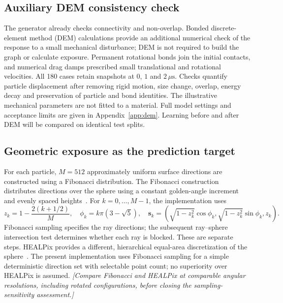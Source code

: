 \documentclass[11pt,a4paper]{article}
\newcommand{\pending}[1]{{\color{red}\textit{[#1]}}}
\begin{document}
\subsection{Auxiliary DEM consistency check}
The generator already checks connectivity and non-overlap. Bonded discrete-element method (DEM) calculations provide an additional numerical check of the response to a small mechanical disturbance; DEM is not required to build the graph or calculate exposure. Permanent rotational bonds join the initial contacts, and numerical drag damps prescribed small translational and rotational velocities. All 180 cases retain snapshots at $0$, $1$ and $2\,\mu\mathrm{s}$. Checks quantify particle displacement after removing rigid motion, size change, overlap, energy decay and preservation of particle and bond identities. The illustrative mechanical parameters are not fitted to a material. Full model settings and acceptance limits are given in Appendix~\ref{app:dem}. Learning before and after DEM will be compared on identical test splits.

\subsection{Geometric exposure as the prediction target}
For each particle, $M=512$ approximately uniform surface directions are constructed using a Fibonacci distribution. The Fibonacci construction distributes directions over the sphere using a constant golden-angle increment and evenly spaced heights~\cite{Gonzalez2010}. For $k=0,\ldots,M-1$, the implementation uses
\begin{equation}
 z_k=1-\frac{2(k+1/2)}{M},\quad \phi_k=k\pi(3-\sqrt{5}),\quad
 \boldsymbol{s}_k=\left(\sqrt{1-z_k^2}\cos\phi_k,\sqrt{1-z_k^2}\sin\phi_k,z_k\right).
\end{equation}
Fibonacci sampling specifies the ray directions; the subsequent ray--sphere intersection test determines whether each ray is blocked. These are separate steps. HEALPix provides a different, hierarchical equal-area discretization of the sphere~\cite{Gorski2005}. The present implementation uses Fibonacci sampling for a simple deterministic direction set with selectable point count; no superiority over HEALPix is assumed. \pending{Compare Fibonacci and HEALPix at comparable angular resolutions, including rotated configurations, before closing the sampling-sensitivity assessment.}
\end{document}
